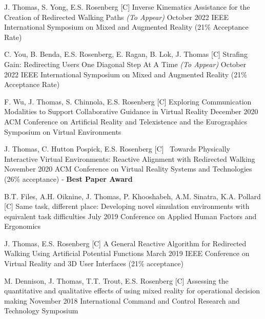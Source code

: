 \setcounter{npubs}{1}
\begin{cvpubs}
  \cvpub
    {J. Thomas, S. Yong, E.S. Rosenberg} %
    {[C\thenpubs] Inverse Kinematics Assistance for the Creation of Redirected Walking Paths \textit{(To Appear)}} %
    {October 2022} %
    {IEEE International Symposium on Mixed and Augmented Reality (21\% Acceptance Rate)} %
      
  \cvpub
    {C. You, B. Benda, E.S. Rosenberg, E. Ragan, B. Lok, J. Thomas} %
    {[C\thenpubs] Strafing Gain: Redirecting Users One Diagonal Step At A Time \textit{(To Appear)}} %
    {October 2022} %
    {IEEE International Symposium on Mixed and Augmented Reality (21\% Acceptance Rate)} %
    
  \cvpub
    {F. Wu, J. Thomas, S. Chinnola, E.S. Rosenberg} %
    {[C\thenpubs] Exploring Communication Modalities to Support Collaborative Guidance in Virtual Reality} %
    {December 2020} %
    {ACM Conference on Artificial Reality and Telexistence and the Eurographics Symposium on Virtual Environments}%
    
  \cvpub
    {J. Thomas, C. Hutton Pospick, E.S. Rosenberg} %
    {[C\thenpubs]\ \textcolor{awesome}{\faTrophy} Towards Physically Interactive Virtual Environments: Reactive Alignment with Redirected Walking} %
    {November 2020} %
    {ACM Conference on Virtual Reality Systems and Technologies (26\% acceptance) - \textbf{Best Paper Award}}
    
  \cvpub
    {B.T. Files, A.H. Oiknine, J. Thomas, P. Khooshabeh, A.M. Sinatra, K.A. Pollard} %
    {[C\thenpubs] Same task, different place: Developing novel simulation environments with equivalent task difficulties} %
    {July 2019} %
    {Conference on Applied Human Factors and Ergonomics} %
    
  \cvpub
    {J. Thomas, E.S. Rosenberg} %
    {[C\thenpubs] A General Reactive Algorithm for Redirected Walking Using Artificial Potential Functions} %
    {March 2019} %
    {IEEE Conference on Virtual Reality and 3D User Interfaces (21\% acceptance)}
    
  \cvpub
    {M. Dennison, J. Thomas, T.T. Trout, E.S. Rosenberg} %
    {[C\thenpubs] Assessing the quantitative and qualitative effects of using mixed reality for operational decision making} %
    {November 2018} %
    {International Command and Control Research and Technology Symposium} %
    

\end{cvpubs}
